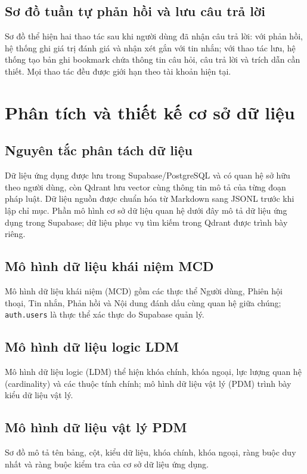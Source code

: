 \documentclass[12pt,a4paper,oneside]{report}
\begin{document}
\subsection{Sơ đồ tuần tự phản hồi và lưu câu trả lời}
Sơ đồ thể hiện hai thao tác sau khi người dùng đã nhận câu trả lời: với phản hồi, hệ thống ghi giá trị đánh giá và nhận xét gắn với tin nhắn; với thao tác lưu, hệ thống tạo bản ghi bookmark chứa thông tin câu hỏi, câu trả lời và trích dẫn cần thiết. Mọi thao tác đều được giới hạn theo tài khoản hiện tại.

\section{Phân tích và thiết kế cơ sở dữ liệu}
\subsection{Nguyên tắc phân tách dữ liệu}
Dữ liệu ứng dụng được lưu trong Supabase/PostgreSQL và có quan hệ sở hữu theo người dùng, còn Qdrant lưu vector cùng thông tin mô tả của từng đoạn pháp luật. Dữ liệu nguồn được chuẩn hóa từ Markdown sang JSONL trước khi lập chỉ mục. Phần mô hình cơ sở dữ liệu quan hệ dưới đây mô tả dữ liệu ứng dụng trong Supabase; dữ liệu phục vụ tìm kiếm trong Qdrant được trình bày riêng.

\subsection{Mô hình dữ liệu khái niệm MCD}
Mô hình dữ liệu khái niệm (MCD) gồm các thực thể Người dùng, Phiên hội thoại, Tin nhắn, Phản hồi và Nội dung đánh dấu cùng quan hệ giữa chúng; \texttt{auth.users} là thực thể xác thực do Supabase quản lý.

\subsection{Mô hình dữ liệu logic LDM}
Mô hình dữ liệu logic (LDM) thể hiện khóa chính, khóa ngoại, lực lượng quan hệ (cardinality) và các thuộc tính chính; mô hình dữ liệu vật lý (PDM) trình bày kiểu dữ liệu vật lý.

\subsection{Mô hình dữ liệu vật lý PDM}
Sơ đồ mô tả tên bảng, cột, kiểu dữ liệu, khóa chính, khóa ngoại, ràng buộc duy nhất và ràng buộc kiểm tra của cơ sở dữ liệu ứng dụng.
\end{document}
